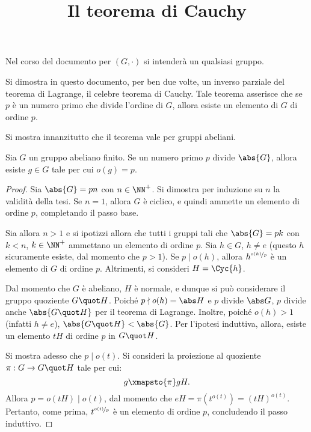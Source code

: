 \documentclass[12pt]{scrartcl}
\begin{document}
	\title{Il teorema di Cauchy}
	\maketitle
	
	\begin{note}
		Nel corso del documento per $(G, \cdot)$ si intenderà un qualsiasi gruppo.
	\end{note}
	
	Si dimostra in questo documento, per ben due volte, un inverso parziale
	del teorema di Lagrange, il celebre teorema di Cauchy. Tale teorema
	asserisce che se $p$ è un numero primo che divide l'ordine di $G$,
	allora esiste un elemento di $G$ di ordine $p$. \medskip
	
	
	Si mostra innanzitutto che il teorema vale per gruppi abeliani.
	
	\begin{theorem}
		Sia $G$ un gruppo abeliano finito. Se un numero primo $p$ divide $\abs{G}$, allora
		esiste $g \in G$ tale per cui $o(g) = p$.
	\end{theorem}
	
	\begin{proof}
		Sia $\abs{G} = pn$ con $n \in \NN^+$. Si dimostra per induzione su $n$ la
		validità della tesi. Se $n = 1$, allora $G$ è ciclico, e quindi ammette un
		elemento di ordine $p$, completando il passo base. \medskip
		
		
		Sia allora $n > 1$ e si ipotizzi allora che tutti i gruppi tali che $\abs{G} = pk$ con $k < n$, $k \in \NN^+$ ammettano un elemento di ordine $p$. Sia $h \in G$, $h \neq e$ (questo $h$ sicuramente esiste, dal momento che $p > 1$). Se $p \mid o(h)$, allora
		$h^{\nicefrac{o(h)}{p}}$ è un elemento di $G$ di ordine $p$. Altrimenti,
		si consideri $H = \Cyc{h}$. \medskip
		
		
		Dal momento che $G$ è abeliano, $H$ è normale, e dunque si può considerare il gruppo quoziente $G \quot H$. Poiché $p \nmid o(h) = \abs H$ e $p$ divide $\abs G$,
		$p$ divide anche $\abs{G \quot H}$ per il teorema di Lagrange. Inoltre, poiché
		$o(h) > 1$ (infatti $h \neq e$), $\abs{G \quot H} < \abs{G}$. Per l'ipotesi
		induttiva, allora, esiste un elemento $tH$ di ordine $p$ in $G \quot H$. \medskip
		
		
		Si mostra adesso che $p \mid o(t)$. Si consideri la proiezione al quoziente $\pi : G \to G \quot H$ tale per cui:
		\[ g \xmapsto{\pi} gH. \]
		Allora $p = o(tH) \mid o(t)$, dal momento che $eH=\pi(t^{o(t)})=(tH)^{o(t)}$.
		Pertanto, come prima, $t^{\nicefrac{o(t)}{p}}$ è un elemento di ordine $p$,
		concludendo il passo induttivo.
	\end{proof} \bigskip
	
\end{document}
